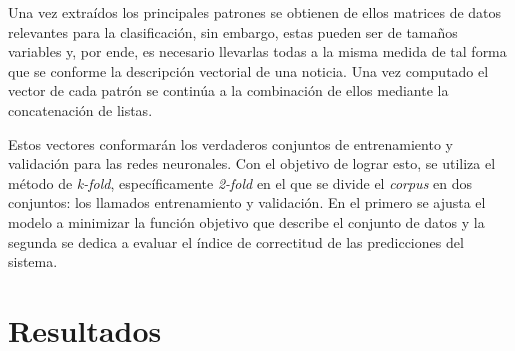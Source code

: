 \documentclass{llncs}
\begin{document}
\begin{multicols}{2}[]
Una vez extra\'idos los principales patrones se obtienen de ellos matrices de datos relevantes para la clasificaci\'on, sin embargo, estas pueden ser de tama\~nos variables y, por ende,
es necesario llevarlas todas a la misma medida de tal forma que se conforme la descripci\'on vectorial de una noticia. Una vez computado el vector de cada patr\'on se contin\'ua a la 
combinaci\'on de ellos mediante la concatenaci\'on de listas.

Estos vectores conformar\'an los verdaderos conjuntos de entrenamiento y validaci\'on para las redes neuronales. Con el objetivo de lograr esto, se utiliza el m\'etodo de \textit{k-fold},
espec\'ificamente \textit{2-fold} en el que se divide el \textit{corpus} en dos conjuntos: los llamados entrenamiento y validaci\'on. En el primero se ajusta el modelo a minimizar la funci\'on
objetivo que describe el conjunto de datos y la segunda se dedica a evaluar el \'indice de correctitud de las predicciones del sistema.

\section{Resultados}


\end{multicols}



\end{document}
